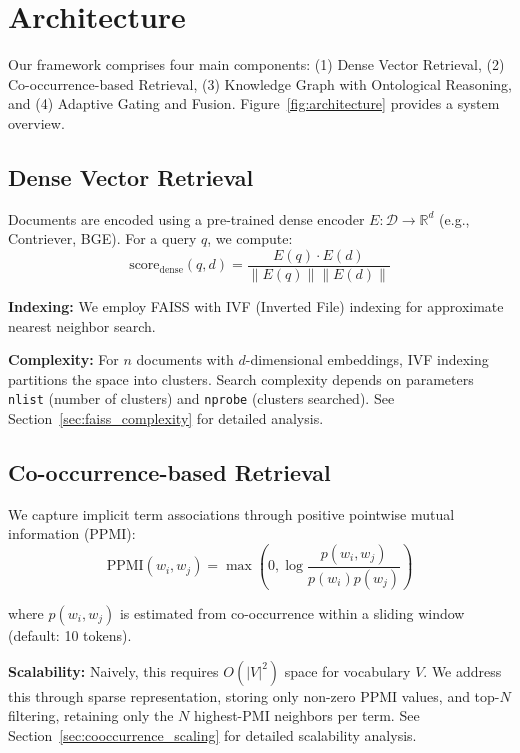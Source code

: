 \documentclass[11pt,a4paper]{article}
\begin{document}
\section{Architecture}
\label{sec:architecture}

Our framework comprises four main components: (1) Dense Vector Retrieval, (2) Co-occurrence-based Retrieval, (3) Knowledge Graph with Ontological Reasoning, and (4) Adaptive Gating and Fusion. Figure~\ref{fig:architecture} provides a system overview.

\subsection{Dense Vector Retrieval}
\label{sec:dense_retrieval}

Documents are encoded using a pre-trained dense encoder $E: \mathcal{D} \rightarrow \mathbb{R}^d$ (e.g., Contriever, BGE). For a query $q$, we compute:
\begin{equation}
\text{score}_{\text{dense}}(q, d) = \frac{E(q) \cdot E(d)}{\|E(q)\| \|E(d)\|}
\end{equation}

\textbf{Indexing:} We employ FAISS \citep{johnson2019billion} with IVF (Inverted File) indexing for approximate nearest neighbor search.

\textbf{Complexity:} For $n$ documents with $d$-dimensional embeddings, IVF indexing partitions the space into clusters. Search complexity depends on parameters \texttt{nlist} (number of clusters) and \texttt{nprobe} (clusters searched). See Section~\ref{sec:faiss_complexity} for detailed analysis.

\subsection{Co-occurrence-based Retrieval}
\label{sec:cooccurrence}

We capture implicit term associations through positive pointwise mutual information (PPMI):
\begin{equation}
\text{PPMI}(w_i, w_j) = \max\left(0, \log \frac{p(w_i, w_j)}{p(w_i) p(w_j)}\right)
\end{equation}

where $p(w_i, w_j)$ is estimated from co-occurrence within a sliding window (default: 10 tokens).

\textbf{Scalability:} Naively, this requires $O(|V|^2)$ space for vocabulary $V$. We address this through sparse representation, storing only non-zero PPMI values, and top-$N$ filtering, retaining only the $N$ highest-PMI neighbors per term. See Section~\ref{sec:cooccurrence_scaling} for detailed scalability analysis.
\end{document}
